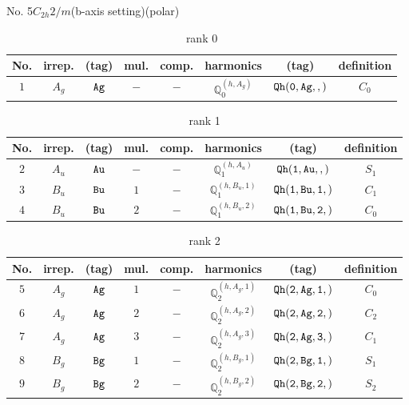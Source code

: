 \documentclass[fleqn,8pt]{jsarticle}
\begin{document}
\setcounter{MaxMatrixCols}{16}

\begin{center}
\LARGE
No. 5\quad$C_{2h}$\quad$2/m$\quad(b-axis setting)\quad[ monoclinic ] (polar)
\end{center}
\begin{table}[ht!]
\begin{center}
\caption{rank 0}
\renewcommand{\arraystretch}{1.3}
\begin{tabular}{cccccccc} \hline \hline
No. & irrep. & (tag) & mul. & comp. & harmonics & (tag) & definition \\ \hline
$ 1 $ & $ A_{g} $ & $ {\tt Ag} $ & $ - $ & $ - $ & $ \mathbb{Q}_{0}^{(h,A_{g})} $ & $ {\tt Qh(0,Ag,,)} $ & $ C_{0} $ \\
 \hline \hline
\end{tabular}
\end{center}
\end{table}
\begin{table}[ht!]
\begin{center}
\caption{rank 1}
\renewcommand{\arraystretch}{1.3}
\begin{tabular}{cccccccc} \hline \hline
No. & irrep. & (tag) & mul. & comp. & harmonics & (tag) & definition \\ \hline
$ 2 $ & $ A_{u} $ & $ {\tt Au} $ & $ - $ & $ - $ & $ \mathbb{Q}_{1}^{(h,A_{u})} $ & $ {\tt Qh(1,Au,,)} $ & $ S_{1} $ \\
$ 3 $ & $ B_{u} $ & $ {\tt Bu} $ & $ 1 $ & $ - $ & $ \mathbb{Q}_{1}^{(h,B_{u},1)} $ & $ {\tt Qh(1,Bu,1,)} $ & $ C_{1} $ \\
$ 4 $ & $ B_{u} $ & $ {\tt Bu} $ & $ 2 $ & $ - $ & $ \mathbb{Q}_{1}^{(h,B_{u},2)} $ & $ {\tt Qh(1,Bu,2,)} $ & $ C_{0} $ \\
 \hline \hline
\end{tabular}
\end{center}
\end{table}
\begin{table}[ht!]
\begin{center}
\caption{rank 2}
\renewcommand{\arraystretch}{1.3}
\begin{tabular}{cccccccc} \hline \hline
No. & irrep. & (tag) & mul. & comp. & harmonics & (tag) & definition \\ \hline
$ 5 $ & $ A_{g} $ & $ {\tt Ag} $ & $ 1 $ & $ - $ & $ \mathbb{Q}_{2}^{(h,A_{g},1)} $ & $ {\tt Qh(2,Ag,1,)} $ & $ C_{0} $ \\
$ 6 $ & $ A_{g} $ & $ {\tt Ag} $ & $ 2 $ & $ - $ & $ \mathbb{Q}_{2}^{(h,A_{g},2)} $ & $ {\tt Qh(2,Ag,2,)} $ & $ C_{2} $ \\
$ 7 $ & $ A_{g} $ & $ {\tt Ag} $ & $ 3 $ & $ - $ & $ \mathbb{Q}_{2}^{(h,A_{g},3)} $ & $ {\tt Qh(2,Ag,3,)} $ & $ C_{1} $ \\
$ 8 $ & $ B_{g} $ & $ {\tt Bg} $ & $ 1 $ & $ - $ & $ \mathbb{Q}_{2}^{(h,B_{g},1)} $ & $ {\tt Qh(2,Bg,1,)} $ & $ S_{1} $ \\
$ 9 $ & $ B_{g} $ & $ {\tt Bg} $ & $ 2 $ & $ - $ & $ \mathbb{Q}_{2}^{(h,B_{g},2)} $ & $ {\tt Qh(2,Bg,2,)} $ & $ S_{2} $ \\
 \hline \hline
\end{tabular}
\end{center}
\end{table}
\end{document}
